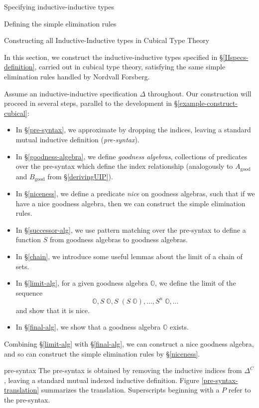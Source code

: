\documentclass[runningheads]{llncs}
\newcommand{\good}[1]{{#1}_\text{good}}
\newcommand{\bbO}{\mathbb{O}}
\def\Forsberg/{Nordvall Forsberg}
\begin{document}
{\begin{section}{Specifying inductive-inductive types}
\begin{subsection}{\label{simple-elim-section}Defining the simple elimination rules}
\end{subsection}

\end{section}

\begin{section}{Constructing all Inductive-Inductive types in Cubical Type Theory}\label{construct-cubical}

In this section, we construct the inductive-inductive types specified in \S\ref{IIspecs-definition}, carried out in cubical type theory, satisfying the same simple elimination rules handled by \Forsberg/.

Assume an inductive-inductive specification $\Delta$ throughout. Our construction will proceed in several steps, parallel to the development in \S\ref{example-construct-cubical}:
\begin{itemize}
    \item In \S\ref{pre-syntax}, we approximate by dropping the indices, leaving a standard mutual inductive definition (\emph{pre-syntax}).
    \item In \S\ref{goodness-algebra}, we define \emph{goodness algebras}, collections of predicates over the pre-syntax which define the index relationship (analogously to $\good{A}$ and $\good{B}$ from \S\ref{derivingUIP}).
    \item In \S\ref{niceness}, we define a predicate \emph{nice} on goodness algebras, such that if we have a nice goodness algebra, then we can construct the simple elimination rules.
    \item In \S\ref{successor-alg}, we use pattern matching over the pre-syntax to define a function $S$ from goodness algebras to goodness algebras.
    \item In \S\ref{chain}, we introduce some useful lemmas about the limit of a chain of sets.
    \item In \S\ref{limit-alg}, for a given goodness algebra $\bbO$, we define the limit of the sequence \[\bbO, S\;\bbO, S\;(S\;\bbO), \dots, S^n\;\bbO,\dots\] and show that it is nice.
    \item In \S\ref{final-alg}, we show that a goodness algebra $\bbO$ exists.
\end{itemize}
Combining \S\ref{limit-alg} with \S\ref{final-alg}, we can construct a nice goodness algebra, and so can construct the simple elimination rules by \S\ref{niceness}.

\begin{subsection}{pre-syntax}\label{pre-syntax}
The pre-syntax is obtained by removing the inductive indices from $\Delta^C$, leaving a standard mutual indexed inductive definition.
Figure \ref{pre-syntax-translation} summarizes the translation. Superscripts beginning with a $P$ refer to the pre-syntax.


\end{subsection}
\end{section}}
\end{document}

